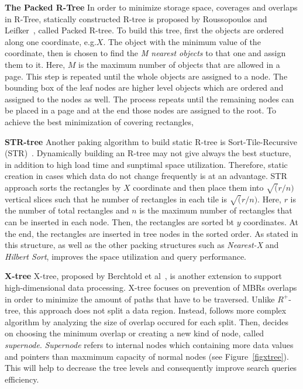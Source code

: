 \documentclass[a4paper,12pt]{article}
\begin{document}
\textbf{The Packed R-Tree}
In order to minimize storage space, coverages and overlaps in R-Tree, statically constructed R-tree is proposed by Roussopoulos and Leifker~\cite{packedrtree, packedrtree2}, called Packed R-tree. To build this tree, first the objects are ordered along one coordinate, e.g.$X$. The object with the minimum value of the coordinate, then is chosen to find the \textit{M nearest objects} to that one and assign them to it. Here, $M$ is the maximum number of objects that are allowed in a page. This step is repeated until the whole objects are assigned to a node. The bounding box of the leaf nodes are higher level objects which are ordered and assigned to the nodes as well. The process repeats until the remaining nodes can be placed in a page and at the end those nodes are assigned to the root. 
To achieve the best minimization of covering rectangles, 


\textbf{STR-tree}
Another paking algorithm to build static R-tree is Sort-Tile-Recursive (STR)~\cite{strtree}. Dynamically building an R-tree may not give always the best stucture, in addition to high load time and sunptimal space utilization. Therefore, static creation in cases which data do not change frequently is at an advantage. STR approach sorts the rectangles by $X$ coordinate and then place them into $\sqrt(r/n)$ vertical slices such that he number of rectangles in each tile is $\sqrt(r/n)$. Here, $r$ is the number of total rectangles and $n$ is the maximum number of rectangles that can be inserted in each node. Then, the rectangles are sorted bt $y$ coordinates. At the end, the rectangles are inserted in tree nodes in the sorted order.
As stated in \cite{strtree} this structure, as well as the other packing structures such as \textit{Nearest-X} and \textit{Hilbert Sort}, improves the space utilization and query performance. 

\textbf{X-tree}
X-tree, proposed by Berchtold et al~\cite{xtree}, is another extension to support high-dimensional data processing. X-tree focuses on prevention of MBRs overlaps in order to minimize the amount of paths that have to be traversed. Unlike $R^+$-tree, this approach does not split a data region. Instead, follows more complex algorithm by analyzing the size of overlap occured for each split. Then, decides on choosing the minimum overlap or creating a new kind of node, called \textit{supernode}. \textit{Supernode} refers to internal nodes which containing more data values and pointers than maxmimum capacity of normal nodes (see Figure~\ref{figxtree}). This will help to decrease the tree levels and consequently improve search queries efficiency.
\end{document}
